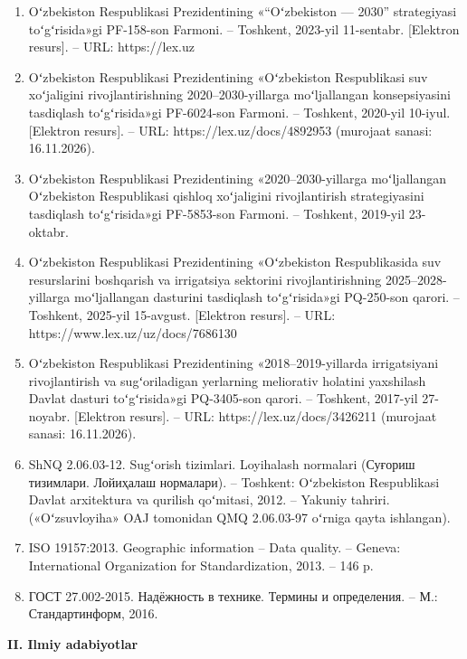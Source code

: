 \begin{enumerate}
\def\labelenumi{\arabic{enumi}.}
\item
  Oʻzbekiston Respublikasi Prezidentining «``Oʻzbekiston --- 2030''
  strategiyasi toʻgʻrisida»gi PF-158-son Farmoni. -- Toshkent, 2023-yil
  11-sentabr. {[}Elektron resurs{]}. -- URL: https://lex.uz
\item
  Oʻzbekiston Respublikasi Prezidentining «Oʻzbekiston Respublikasi suv
  xoʻjaligini rivojlantirishning 2020--2030-yillarga moʻljallangan
  konsepsiyasini tasdiqlash toʻgʻrisida»gi PF-6024-son Farmoni. --
  Toshkent, 2020-yil 10-iyul. {[}Elektron resurs{]}. -- URL:
  https://lex.uz/docs/4892953 (murojaat sanasi: 16.11.2026).
\item
  Oʻzbekiston Respublikasi Prezidentining «2020--2030-yillarga
  moʻljallangan Oʻzbekiston Respublikasi qishloq xoʻjaligini
  rivojlantirish strategiyasini tasdiqlash toʻgʻrisida»gi PF-5853-son
  Farmoni. -- Toshkent, 2019-yil 23-oktabr.
\item
  Oʻzbekiston Respublikasi Prezidentining «Oʻzbekiston Respublikasida
  suv resurslarini boshqarish va irrigatsiya sektorini
  rivojlantirishning 2025--2028-yillarga moʻljallangan dasturini
  tasdiqlash toʻgʻrisida»gi PQ-250-son qarori. -- Toshkent, 2025-yil
  15-avgust. {[}Elektron resurs{]}. -- URL:
  https://www.lex.uz/uz/docs/7686130
\item
  Oʻzbekiston Respublikasi Prezidentining «2018--2019-yillarda
  irrigatsiyani rivojlantirish va sugʻoriladigan yerlarning meliorativ
  holatini yaxshilash Davlat dasturi toʻgʻrisida»gi PQ-3405-son qarori.
  -- Toshkent, 2017-yil 27-noyabr. {[}Elektron resurs{]}. -- URL:
  https://lex.uz/docs/3426211 (murojaat sanasi: 16.11.2026).
\item
  ShNQ 2.06.03-12. Sugʻorish tizimlari. Loyihalash normalari (Суғориш
  тизимлари. Лойиҳалаш нормалари). -- Toshkent: Oʻzbekiston Respublikasi
  Davlat arxitektura va qurilish qoʻmitasi, 2012. -- Yakuniy tahriri.
  («Oʻzsuvloyiha» OAJ tomonidan QMQ 2.06.03-97 oʻrniga qayta ishlangan).
\item
  ISO 19157:2013. Geographic information -- Data quality. -- Geneva:
  International Organization for Standardization, 2013. -- 146 p.
\item
  ГОСТ 27.002-2015. Надёжность в технике. Термины и определения. -- М.:
  Стандартинформ, 2016.
\end{enumerate}

\textbf{II. Ilmiy adabiyotlar}


